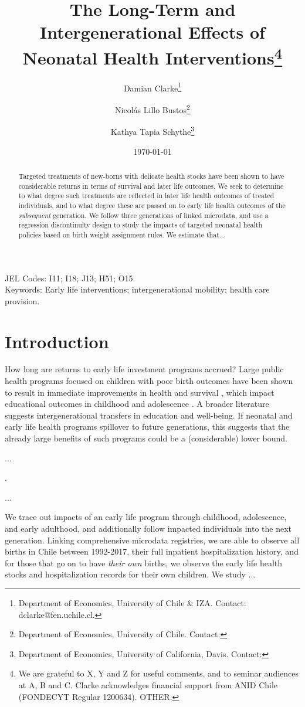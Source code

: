 \documentclass[11pt]{article}
\title{The Long-Term and Intergenerational Effects of Neonatal Health Interventions\thanks{We are grateful to X, Y and Z for useful comments, and to seminar audiences at A, B and C. Clarke acknowledges financial support from ANID Chile (FONDECYT Regular 1200634).  OTHER.  }}
\author{Damian Clarke\thanks{Department of Economics, University of Chile \& IZA.  Contact: dclarke@fen.uchile.cl.}
  \and Nicol\'as Lillo Bustos\thanks{Department of Economics, University of Chile.  Contact:}
  \and Kathya Tapia Schythe\thanks{Department of Economics, University of California, Davis.  Contact:}
}
\date{\today}
\begin{document}
\begin{spacing}{1.5}
  \maketitle

  \begin{abstract}
    Targeted treatments of new-borns with delicate health stocks have been shown to have considerable returns in terms of survival and later life outcomes.  We seek to determine to what degree such treatments are reflected in later life health outcomes of treated individuals, and to what degree these are passed on to early life health outcomes of the \emph{subsequent} generation.  We follow three generations of linked microdata, and use a regression discontinuity design to study the impacts of targeted neonatal health policies based on birth weight assignment rules.  We estimate that...
  \end{abstract}

  \noindent JEL Codes: I11; I18; J13; H51; O15. \\
  Keywords: Early life interventions; intergenerational mobility; health care provision. \\

  \clearpage

  \section{Introduction}
  How long are returns to early life investment programs accrued?  Large public health programs focused on children with poor birth outcomes have been shown to result in immediate improvements in health and survival \citep{Almondetal2010}, which impact educational outcomes in childhood and adolescence \citep{Bharadwajetal2013}.  A broader literature suggests intergenerational transfers in education and well-being.  If neonatal and early life health programs spillover to future generations, this suggests that the already large benefits of such programs could be a (considerable) lower bound.

  ...

  \citet{Cattaneoetal2019}.

  ...

  We trace out impacts of an early life program through childhood, adolescence, and early adulthood, and additionally follow impacted individuals into the next generation.  Linking comprehensive microdata registries, we are able to observe all births in Chile between 1992-2017, their full inpatient hospitalization history, and for those that go on to have \emph{their own} births, we observe the early life health stocks and hospitalization records for their own children.  We study ...


\end{spacing}
\end{document}
